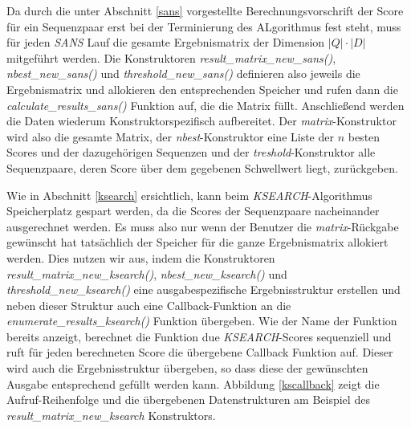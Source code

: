 \documentclass{article}
\begin{document}
Da durch die unter Abschnitt \ref{sans} vorgestellte Berechnungsvorschrift der Score für ein Sequenzpaar erst bei der Terminierung des ALgorithmus
fest steht, muss für jeden \emph{SANS} Lauf die gesamte Ergebnismatrix der Dimension $|Q|\cdot|D|$ mitgeführt werden. Die Konstruktoren 
\emph{result\_matrix\_new\_sans()}, \emph{nbest\_new\_sans()} und  \emph{threshold\_new\_sans()} definieren also jeweils die Ergebnismatrix und allokieren
den entsprechenden Speicher und rufen dann die \emph{calculate\_results\_sans()} Funktion auf, die die Matrix füllt. Anschließend werden die Daten 
wiederum Konstruktorspezifisch aufbereitet. Der \emph{matrix}-Konstruktor wird also die gesamte Matrix, der \emph{nbest}-Konstruktor eine
Liste der $n$ besten Scores und der dazugehörigen Sequenzen und der \emph{treshold}-Konstruktor alle Sequenzpaare, deren Score über dem gegebenen
Schwellwert liegt, zurückgeben.

Wie in Abschnitt \ref{ksearch} ersichtlich, kann beim \emph{KSEARCH}-Algorithmus Speicherplatz gespart werden, da die Scores der Sequenzpaare
nacheinander ausgerechnet werden. Es muss also nur wenn der Benutzer die \emph{matrix}-Rückgabe gewünscht hat tatsächlich der Speicher für die
ganze Ergebnismatrix allokiert werden. Dies nutzen wir aus, indem die Konstruktoren \emph{result\_matrix\_new\_ksearch()}, \emph{nbest\_new\_ksearch()} 
und  \emph{threshold\_new\_ksearch()} eine ausgabespezifische Ergebnisstruktur erstellen und neben dieser Struktur auch eine Callback-Funktion an 
die \emph{enumerate\_results\_ksearch()} Funktion übergeben. Wie der Name der Funktion bereits anzeigt, berechnet die Funktion due \emph{KSEARCH}-Scores
sequenziell und ruft für jeden berechneten Score die übergebene Callback Funktion auf. Dieser wird auch die Ergebnisstruktur übergeben, so dass diese
der gewünschten Ausgabe entsprechend gefüllt werden kann. Abbildung \ref{kscallback} zeigt die Aufruf-Reihenfolge und die übergebenen Datenstrukturen am
Beispiel des \emph{result\_matrix\_new\_ksearch} Konstruktors.
\end{document}
